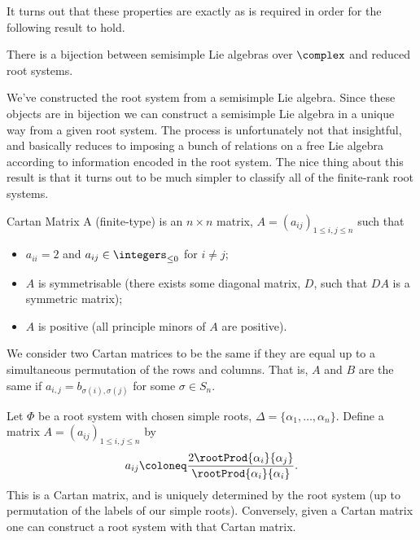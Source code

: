 \documentclass[fleqn]{NotesClass}
\begin{document}
    It turns out that these properties are exactly as is required in order for the following result to hold.
    
    \begin{thm}{}{}
        There is a bijection between semisimple Lie algebras over \(\complex\) and reduced root systems.
    \end{thm}
    
    We've constructed the root system from a semisimple Lie algebra.
    Since these objects are in bijection we can construct a semisimple Lie algebra in a unique way from a given root system.
    The process is unfortunately not that insightful, and basically reduces to imposing a bunch of relations on a free Lie algebra according to information encoded in the root system.
    The nice thing about this result is that it turns out to be much simpler to classify all of the finite-rank root systems.
    
    \begin{dfn}{Cartan Matrix}{}
        A (finite-type)  is an \(n \times n\) matrix, \(A = (a_{ij})_{1 \le i, j \le n}\) such that
        \begin{itemize}
            \item \(a_{ii} = 2\) and \(a_{ij} \in \integers_{\le 0}\) for \(i \ne j\);
            \item \(A\) is symmetrisable (there exists some diagonal matrix, \(D\), such that \(DA\) is a symmetric matrix);
            \item \(A\) is positive (all principle minors of \(A\) are positive).
        \end{itemize}
    We consider two Cartan matrices to be the same if they are equal up to a simultaneous permutation of the rows and columns.
    That is, \(A\) and \(B\) are the same if \(a_{i,j} = b_{\sigma(i),\sigma(j)}\) for some \(\sigma \in S_n\).
    \end{dfn}
    
    \begin{lma}{}{}
        Let \(\Phi\) be a root system with chosen simple roots, \(\Delta = \{\alpha_1, \dotsc, \alpha_n\}\).
        Define a matrix \(A = (a_{ij})_{1 \le i, j \le n}\) by
        \begin{equation}
            a_{ij} \coloneq \frac{2\rootProd{\alpha_i}{\alpha_j}}{\rootProd{\alpha_i}{\alpha_i}}.
        \end{equation}
        This is a Cartan matrix, and is uniquely determined by the root system (up to permutation of the labels of our simple roots).
        Conversely, given a Cartan matrix one can construct a root system with that Cartan matrix.
    \end{lma}
    
\end{document}

